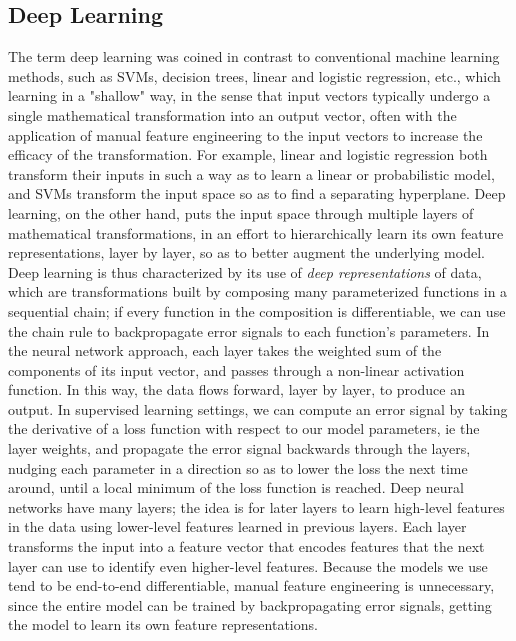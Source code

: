 \documentclass{article}
\begin{document}
\subsection{Deep Learning}
The term deep learning was coined in contrast to conventional machine learning methods, such as SVMs, decision trees, linear and logistic regression, etc., which learning in a "shallow" way, in the sense that input vectors typically undergo a single mathematical transformation into an output vector, often with the application of manual feature engineering to the input vectors to increase the efficacy of the transformation. For example, linear and logistic regression both transform their inputs in such a way as to learn a linear or probabilistic model, and SVMs transform the input space so as to find a separating hyperplane. Deep learning, on the other hand, puts the input space through multiple layers of mathematical transformations, in an effort to hierarchically learn its own feature representations, layer by layer, so as to better augment the underlying model. Deep learning is thus characterized by its use of \textit{deep representations} of data, which are transformations built by composing many parameterized functions in a sequential chain; if every function in the composition is differentiable, we can use the chain rule to backpropagate error signals to each function's parameters.
\newline \newline
In the neural network approach, each layer takes the weighted sum of the components of its input vector, and passes through a non-linear activation function. In this way, the data flows forward, layer by layer, to produce an output. In supervised learning settings, we can compute an error signal by taking the derivative of a loss function with respect to our model parameters, ie the layer weights, and propagate the error signal backwards through the layers, nudging each parameter in a direction so as to lower the loss the next time around, until a local minimum of the loss function is reached. Deep neural networks have many layers; the idea is for later layers to learn high-level features in the data using lower-level features learned in previous layers. Each layer transforms the input into a feature vector that encodes features that the next layer can use to identify even higher-level features. Because the models we use tend to be end-to-end differentiable, manual feature engineering is unnecessary, since the entire model can be trained by backpropagating error signals, getting the model to learn its own feature representations.
\end{document}
